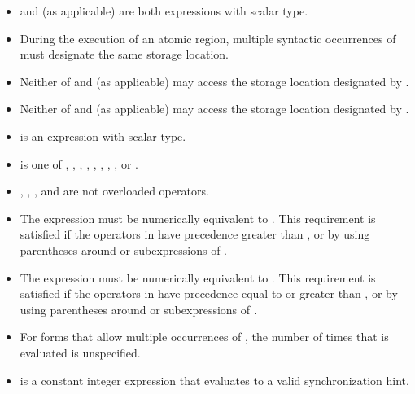 \begin{ccppspecific}
\begin{itemize}
\item {} and  (as applicable) are both  expressions 
      with scalar type.
\item During the execution of an atomic region, multiple syntactic occurrences 
      of  must designate the same storage location.
\item Neither of  and  (as applicable) may access the storage 
      location designated by .
\item Neither of  and  (as applicable) may access the storage 
      location designated by .
\item {} is an expression with scalar type.
\item {} is one of \code{+}, \code{*}, \code{-}, \code{/},
      \code{&}, \code{^}, \code{|}, \code{<<}, or \code{>>}.
\item {}, \code{=}, \code{++}, and \code{--} are not 
      overloaded operators.
\item The expression    must be numerically 
      equivalent to   . This requirement is 
      satisfied if the operators in  have precedence greater than 
      , or by using parentheses around  or 
      subexpressions of .
\item The expression    must be numerically 
      equivalent to   . This requirement is 
      satisfied if the operators in  have precedence equal to or 
      greater than , or by using parentheses around  
      or subexpressions of .
\item For forms that allow multiple occurrences of , the number of 
      times that  is evaluated is unspecified.
\item {} is a constant integer expression that evaluates 
      to a valid synchronization hint.
\end{itemize}

\end{ccppspecific}

